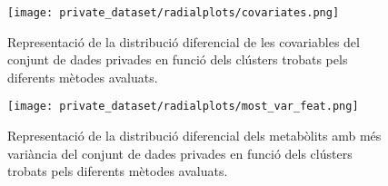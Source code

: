 \documentclass[CAT,BIB]{TFUOC}%
\begin{document}
        \begin{figure}[p]
            \centering
            \texttt{[image: private\_dataset/radialplots/covariates.png]}
            \caption[Distribució diferencial de les covariables a \gls{privades}]{
                Representació de la distribució diferencial
                de les covariables del conjunt de dades \gls{privades}
                en funció dels clústers trobats pels diferents mètodes avaluats.
            }
            \label{f:dchng_radial_covars}
        \end{figure}

        \begin{figure}[p]
            \centering
            \texttt{[image: private\_dataset/radialplots/most\_var\_feat.png]}
            \caption[Distribució diferencial dels metabòlits amb més variància a \gls{privades}]{
                Representació de la distribució diferencial
                dels metabòlits amb més variància del conjunt de dades \gls{privades}
                en funció dels clústers trobats pels diferents mètodes avaluats.
            }
            \label{f:dchng_radial_mostvar}
        \end{figure}
\end{document}
